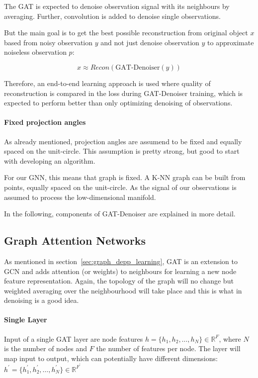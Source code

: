 The GAT is expected to denoise observation signal with its neighbours by averaging. 
Further, convolution is added to denoise single observations.

But the main goal is to get the best possible reconstruction from original object $x$ based from noisy observation $y$ 
and not just denoise observation $y$ to approximate noiseless observation $p$:

\begin{equation}
  x \approx   Recon \left( \text{GAT-Denoiser} \left( y \right) \right)
\end{equation}

Therefore, an end-to-end learning approach is used where quality of reconstruction is 
compared in the loss during GAT-Denoiser training, which is expected to perform better than 
only optimizing denoising of observations.

\paragraph{Fixed projection angles}
As already mentioned, projection angles are assumend to be fixed and equally spaced on the unit-circle.
This assumption is pretty strong, but good to start with developing an algorithm.

\begin{tcolorbox}[colback=red!5!white,colframe=red!75!black]
  For our GNN, this means that graph is fixed. A K-NN graph can be built from points, equally spaced on the unit-circle.
  As the signal of our observations is assumed to process the low-dimensional manifold.
\end{tcolorbox}


In the following, components of GAT-Denoiser are explained in more detail.


\subsection{Graph Attention Networks}
As mentioned in section~\ref{sec:graph_depp_learning}, GAT is an extension to GCN and 
adds attention (or weights) to neighbours for learning a new node feature representation. 
Again, the topology of the graph will no change but weighted averaging over the neighbourhood 
will take place and this is what in denoising is a good idea.

\paragraph{Single Layer}
Input of a single GAT layer are node features $h = \{ h_1, h_2, \dots , h_N \} \in \mathbb{R}^F$, 
where $N$ is the number of nodes and $F$ the number of features per node. 
The layer will map input to output, which can potentially have different dimensions: 
$h^{\prime} = \{ h_1^{\prime}, h_2^{\prime}, \dots, h_N^{\prime} \} \in \mathbb{R}^{F^{\prime}} $


